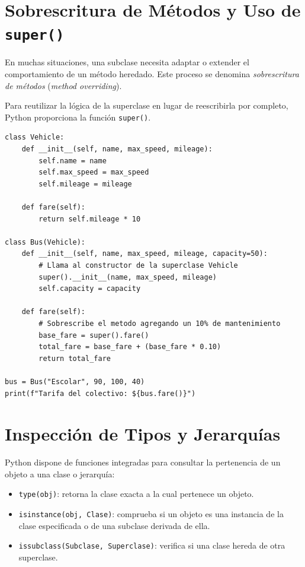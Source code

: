 \section{Sobrescritura de Métodos y Uso de \texttt{super()}}
En muchas situaciones, una subclase necesita adaptar o extender el comportamiento de un método heredado.
Este proceso se denomina \textit{sobrescritura de métodos} (\textit{method overriding}).

Para reutilizar la lógica de la superclase en lugar de reescribirla por completo, Python proporciona la función \texttt{super()}.

\begin{lstlisting}[caption={Uso de \texttt{super()} para extender el constructor y métodos.}, label={list:super_ejemplo}]
class Vehicle:
    def __init__(self, name, max_speed, mileage):
        self.name = name
        self.max_speed = max_speed
        self.mileage = mileage

    def fare(self):
        return self.mileage * 10

class Bus(Vehicle):
    def __init__(self, name, max_speed, mileage, capacity=50):
        # Llama al constructor de la superclase Vehicle
        super().__init__(name, max_speed, mileage)
        self.capacity = capacity

    def fare(self):
        # Sobrescribe el metodo agregando un 10% de mantenimiento
        base_fare = super().fare()
        total_fare = base_fare + (base_fare * 0.10)
        return total_fare

bus = Bus("Escolar", 90, 100, 40)
print(f"Tarifa del colectivo: ${bus.fare()}")
\end{lstlisting}

\section{Inspección de Tipos y Jerarquías}
Python dispone de funciones integradas para consultar la pertenencia de un objeto a una clase o jerarquía:

\begin{itemize}[leftmargin=*]
  \item \texttt{type(obj)}: retorna la clase exacta a la cual pertenece un objeto.
  \item \texttt{isinstance(obj, Clase)}: comprueba si un objeto es una instancia de la clase especificada o de una subclase derivada de ella.
  \item \texttt{issubclass(Subclase, Superclase)}: verifica si una clase hereda de otra superclase.
\end{itemize}

